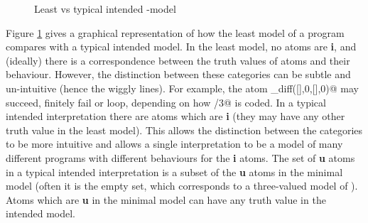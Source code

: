 \documentclass{tlp}
\begin{document}
\begin{figure}[t]
\caption{Least vs typical intended -model\label{fig-venn}}
\end{figure}




Figure \ref{fig-venn} gives a graphical representation of how the
least model of a program compares with a typical intended model.  In the least
model, no atoms are \textbf{i}, and (ideally) there is a correspondence between
the truth values of atoms and their behaviour.
However, the distinction between these categories can be subtle and
un-intuitive (hence the wiggly lines).
For example, the atom \verb@eq_diff([],0,[],0)@ may succeed, 
finitely fail or loop, depending on how \verb@sub/3@ is coded.
In a typical intended interpretation
there are atoms which are \textbf{i} (they may have any other truth value
in the least model).  This allows the distinction between the categories
to be more intuitive and allows a single interpretation to be a model
of many different programs with different behaviours for the \textbf{i}
atoms.  The set of \textbf{u} atoms in a typical intended interpretation
is a subset of the \textbf{u} atoms in the minimal model (often it is
the empty set, which corresponds to a three-valued model of
).  Atoms which
are \textbf{u} in the minimal model can have any truth value in the
intended model.
\end{document}
